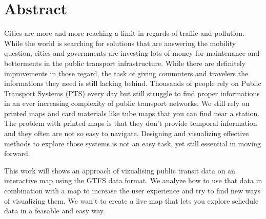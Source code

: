 \thispagestyle{empty}

  \section*{Abstract}
    Cities are more and more reaching a limit in regards of traffic and pollution. While the world is searching for solutions that are answering the mobility question, cities and governments are investing lots of money for maintenance and betterments in the public transport infrastructure. While there are definitely improvements in those regard, the task of giving commuters and travelers the informations they need is still lacking behind. Thousands of people rely on Public Transport Systems (PTS) every day but still struggle to find proper informations in an ever increasing complexity of public transport networks. We still rely on printed maps and card materials like tube maps that you can find near a station. The problem with printed maps is that they don't provide temporal information and they often are not so easy to navigate. Designing and visualizing effective methods to explore those systems is not an easy task, yet still essential in moving forward.

    This work will shows an approach of vizualising public transit data on an interactive map using the GTFS data format. We analyze how to use that data in combination with a map to increase the user experience and try to find new ways of visualizing them. We wan't to create a live map that lets you explore schedule data in a feasable and easy way.

  \pagebreak

